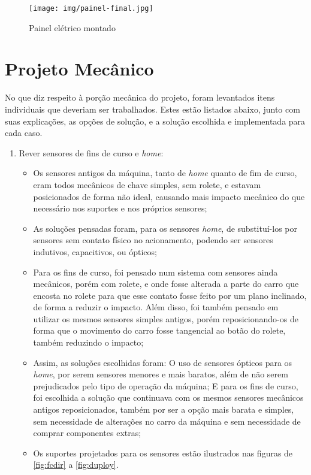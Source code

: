 \documentclass[
	article,			%
	11pt,				%
	oneside,			%
	a4paper,			%
	section=TITLE,		%
	english,			%
	brazil,				%
	sumario=tradicional
	]{abntex2}
\begin{document}
\begin{figure}[H]
    \centering
    \texttt{[image: img/painel-final.jpg]}
    \caption{Painel elétrico montado}
    \label{fig:painel-final}
\end{figure}

\section{Projeto Mecânico}
\label{sec:mecanico}
No que diz respeito à porção mecânica do projeto, foram levantados itens individuais que deveriam ser trabalhados. Estes estão listados abaixo, junto com suas explicações, as opções de solução, e a solução escolhida e implementada para cada caso.
\begin{enumerate}
    \item Rever sensores de fins de curso e \textit{home}:
    \begin{itemize}
        \item Os sensores antigos da máquina, tanto de \textit{home} quanto de fim de curso, eram todos mecânicos de chave simples, sem rolete, e estavam posicionados de forma não ideal, causando mais impacto mecânico do que necessário nos suportes e nos próprios sensores;
        \item As soluções pensadas foram, para os sensores \textit{home}, de substituí-los por sensores sem contato físico no acionamento, podendo ser sensores indutivos, capacitivos, ou ópticos;
        \item Para os fins de curso, foi pensado num sistema com sensores ainda mecânicos, porém com rolete, e onde fosse alterada a parte do carro que encosta no rolete para que esse contato fosse feito por um plano inclinado, de forma a reduzir o impacto. Além disso, foi também pensado em utilizar os mesmos sensores simples antigos, porém reposicionando-os de forma que o movimento do carro fosse tangencial ao botão do rolete, também reduzindo o impacto;
        \item Assim, as soluções escolhidas foram: O uso de sensores ópticos para os \textit{home}, por serem sensores menores e mais baratos, além de não serem prejudicados pelo tipo de operação da máquina; E para os fins de curso, foi escolhida a solução que continuava com os mesmos sensores mecânicos antigos reposicionados, também por ser a opção mais barata e simples, sem necessidade de alterações no carro da máquina e sem necessidade de comprar componentes extras;
        \item Os suportes projetados para os sensores estão ilustrados nas figuras de \ref{fig:fcdir} a \ref{fig:duploy}.

\end{itemize}
\end{enumerate}
\end{document}
